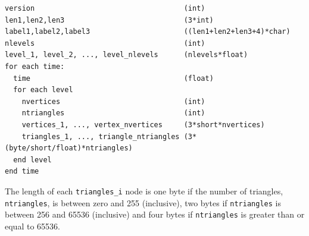 \documentclass[11pt]{book}
\newcommand{\nopart}{\expandafter\def\csname Parent-1\endcsname{}} %
\newcommand{\ct}{\tt\small}
\begin{document}
\footnotesize
\begin{verbatim}
version                                   (int)
len1,len2,len3                            (3*int)
label1,label2,label3                      ((len1+len2+len3+4)*char)
nlevels                                   (int)
level_1, level_2, ..., level_nlevels      (nlevels*float)
for each time:
  time                                    (float)
  for each level
    nvertices                             (int)
    ntriangles                            (int)
    vertices_1, ..., vertex_nvertices     (3*short*nvertices)
    triangles_1, ..., triangle_ntriangles (3*(byte/short/float)*ntriangles)
  end level
end time
\end{verbatim}
\normalsize

\noindent
The length of each {\ct triangles\_i} node is one byte if
the number of triangles, {\ct ntriangles}, is between zero
and 255 (inclusive), two bytes if {\ct ntriangles} is
between 256 and 65536 (inclusive) and four bytes if {\ct ntriangles} is greater than or equal to 65536.



\backmatter
\nopart %


\end{document}
